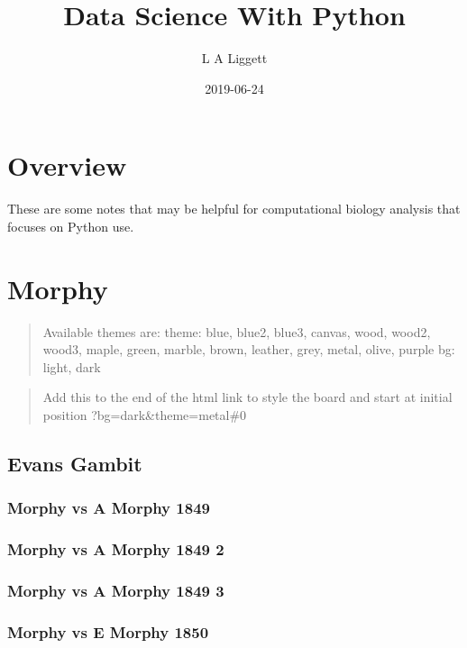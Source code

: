 \documentclass[]{book}
\title{Data Science With Python}
\author{L A Liggett}
\date{2019-06-24}
\begin{document}
\maketitle

{
\setcounter{tocdepth}{1}
\tableofcontents
}
\chapter{Overview}\label{overview}

These are some notes that may be helpful for computational biology
analysis that focuses on Python use.

\chapter{Morphy}\label{morphy}

\begin{quote}
Available themes are: theme: blue, blue2, blue3, canvas, wood, wood2,
wood3, maple, green, marble, brown, leather, grey, metal, olive, purple
bg: light, dark
\end{quote}

\begin{quote}
Add this to the end of the html link to style the board and start at
initial position ?bg=dark\&theme=metal\#0
\end{quote}

\section{Evans Gambit}\label{evans-gambit}

\subsection{Morphy vs A Morphy 1849}\label{morphy-vs-a-morphy-1849}

\subsection{Morphy vs A Morphy 1849 2}\label{morphy-vs-a-morphy-1849-2}

\subsection{Morphy vs A Morphy 1849 3}\label{morphy-vs-a-morphy-1849-3}

\subsection{Morphy vs E Morphy 1850}\label{morphy-vs-e-morphy-1850}
\end{document}
